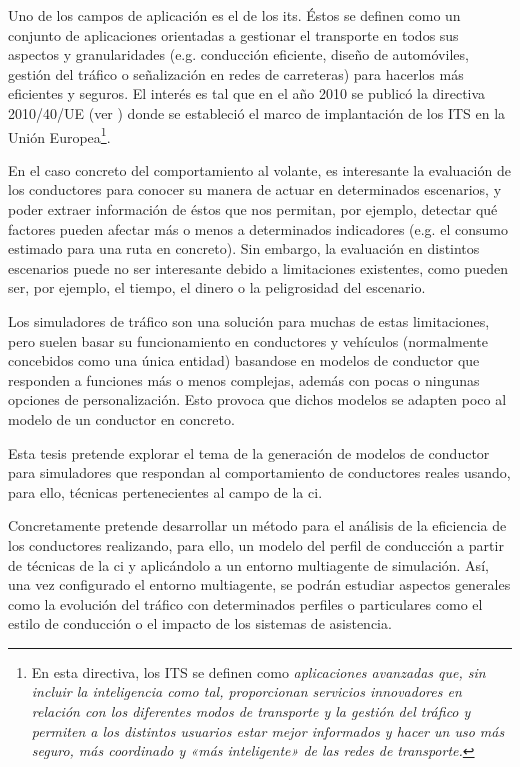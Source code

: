 Uno de los campos de aplicación es el de los \ac{its}. Éstos se definen como un conjunto de aplicaciones orientadas a gestionar el transporte en todos sus aspectos y granularidades (e.g. conducción eficiente, diseño de automóviles, gestión del tráfico o señalización en redes de carreteras) para hacerlos más eficientes y seguros. El interés es tal que en el año 2010 se publicó la directiva 2010/40/UE (ver \cite{parliament2010directive}) donde se estableció el marco de implantación de los ITS en la Unión Europea\footnote{En esta directiva, los ITS se definen como \textit{aplicaciones avanzadas que, sin incluir la inteligencia como tal, proporcionan servicios innovadores en relación con los diferentes modos de transporte y la gestión del tráfico y permiten a los distintos usuarios estar mejor informados y hacer un uso más seguro, más coordinado y «más inteligente» de las redes de transporte.}}.

En el caso concreto del comportamiento al volante, es interesante la evaluación de los conductores para conocer su manera de actuar en determinados escenarios, y poder extraer información de éstos que nos permitan, por ejemplo, detectar qué factores pueden afectar más o menos a determinados indicadores (e.g. el consumo estimado para una ruta en concreto). Sin embargo, la evaluación en distintos escenarios puede no ser interesante debido a limitaciones existentes, como pueden ser, por ejemplo, el tiempo, el dinero o la peligrosidad del escenario.

Los simuladores de tráfico son una solución para muchas de estas limitaciones, pero suelen basar su funcionamiento en conductores y vehículos (normalmente concebidos como una única entidad) basandose en modelos de conductor que responden a funciones más o menos complejas, además con pocas o ningunas opciones de personalización. Esto provoca que dichos modelos se adapten poco al modelo de un conductor en concreto.

Esta tesis pretende explorar el tema de la generación de modelos de conductor para simuladores que respondan al comportamiento de conductores reales usando, para ello, técnicas pertenecientes al campo de la \ac{ci}.

Concretamente pretende desarrollar un método para el análisis de la eficiencia de los conductores realizando, para ello, un modelo del perfil de conducción a partir de técnicas de la \ac{ci} y aplicándolo a un entorno multiagente de simulación. Así, una vez configurado el entorno multiagente, se podrán estudiar aspectos generales como la evolución del tráfico con determinados perfiles o particulares como el estilo de conducción o el impacto de los sistemas de asistencia.


